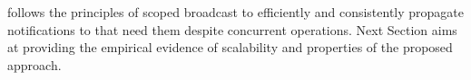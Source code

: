 









\NAME follows the principles of scoped broadcast to efficiently and
consistently propagate notifications to \processes that need them
despite concurrent operations. Next Section aims at providing the
empirical evidence of scalability and properties of the proposed
approach.

